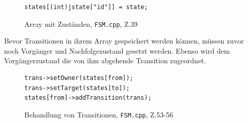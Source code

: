 \begin{figure}[thp]
\begin{lstlisting}
states[(int)jstate["id"]] = state;

\end{lstlisting}
\centering
\caption{Array mit Zuständen, \texttt{FSM.cpp}, Z.39}
\end{figure}



Bevor Transitionen in ihrem Array gespeichert werden können, müssen zuvor noch
Vorgänger und Nachfolgezustand gesetzt werden. Ebenso wird dem Vorgängerzustand
die von ihm abgehende Transition zugeordnet.

\begin{figure}[thp]
\begin{lstlisting}[style=json]
trans->setOwner(states[from]);
trans->setTarget(states[to]);
states[from]->addTransition(trans);

\end{lstlisting}
\centering
\caption{Behandlung von Transitionen, \texttt{FSM.cpp}, Z.53-56}
\end{figure}


